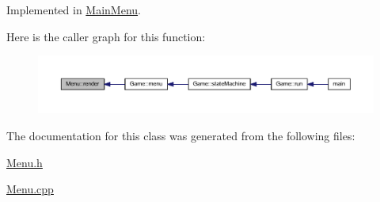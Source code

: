 Implemented in \hyperlink{class_main_menu_a1487a843dd8cf56374afa60a5b62e9bf}{Main\+Menu}.



Here is the caller graph for this function\+:
\nopagebreak
\begin{figure}[H]
\begin{center}
\leavevmode
\includegraphics[width=350pt]{class_menu_aa2297a6abfaa404403fe1b7ae2521f88_icgraph}
\end{center}
\end{figure}




The documentation for this class was generated from the following files\+:\begin{DoxyCompactItemize}
\item 
\hyperlink{_menu_8h}{Menu.\+h}\item 
\hyperlink{_menu_8cpp}{Menu.\+cpp}\end{DoxyCompactItemize}
